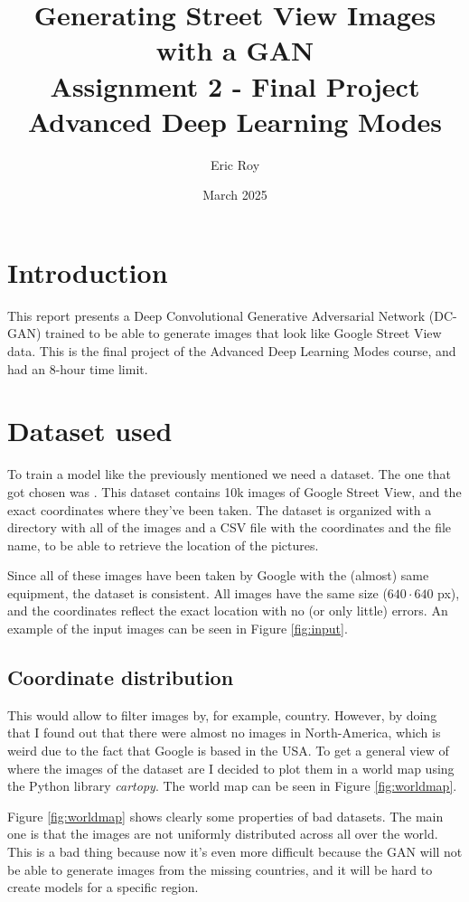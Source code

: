 \documentclass{article}
\title{\textbf{Generating Street View Images with a GAN}\\Assignment 2 - Final Project\\Advanced Deep Learning Modes}
\author{Eric Roy}
\date{March 2025}
\begin{document}
\maketitle

\section{Introduction}

This report presents a Deep Convolutional Generative Adversarial Network (DC-GAN) trained to be
able to generate images that look like Google Street View data.
This is the final project of the Advanced Deep Learning Modes course, and had an 8-hour
time limit.

\section{Dataset used}

To train a model like the previously mentioned we need a dataset. The one that got chosen was 
\cite{google_street_view_dataset}. This dataset
contains 10k images of Google Street View, and the exact coordinates where they've been taken.
The dataset is organized with a directory with all of the images and a CSV file with the 
coordinates and the file name, to be able to retrieve the location of the pictures.

Since all of these images have been taken by Google with the (almost) same equipment, the
dataset is consistent. All images have the same size ($640\cdot640$ px), and the coordinates reflect the exact
location with no (or only little) errors. An example of the input images can be seen in
Figure \ref{fig:input}.

\subsection{Coordinate distribution}

This would allow to filter images by, for example, country. However, by doing that I found out
that there were almost no images in North-America, which is weird due to the fact that Google is
based in the USA. To get a general view of where the images of the dataset are I decided to plot them in a world map using the Python library \textit{cartopy}. The world map can be seen in Figure 
\ref{fig:worldmap}.

Figure \ref{fig:worldmap} shows clearly some properties of bad datasets. The main one is that the images are not uniformly distributed across all over the world. This is a bad thing because now it's even more difficult because the GAN will not be able to generate images from the missing countries, and it will be hard to create models for a specific region.
\end{document}
